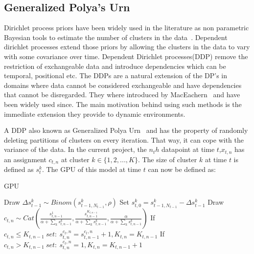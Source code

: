 \documentclass[twoside,hidelinks]{article}
\begin{document}
\subsection{Generalized Polya's Urn}
Dirichlet process priors have been widely used in the literature as non parametric Bayesian tools to estimate the number of clusters in the data~\cite{antoniak}. Dependent dirichlet processes extend those priors by allowing the clusters in the data to vary with some covariance over time. Dependent Dirichlet processes(DDP) remove the restriction of exchangeable data and introduce dependencies which can be temporal, positional etc. The DDPs are a natural extension of the DP's in domains where data cannot be considered exchangeable and have dependencies that cannot be disregarded. They where introduced by MacEachern~\cite{theory:ddp} and have been widely used since. The main motivation behind using such methods is the immediate extension they provide to dynamic environments. 

A DDP also known as Generalized Polya Urn~\cite{caron} and has the property of randomly deleting partitions of clusters on every iteration. That way, it can cope with the variance of the data. In the current project, the $n_th$ datapoint at time $t$,$x_{t,n}$ has an assignment $c_{t,n}$ at cluster $k \in \{1,2,..., K\} $. The size of cluster $k$ at time $t$ is defined as $s_t^k$. The GPU of this model at time $t$ can now be defined as:



\begin{algorithm}
  \caption{GPU}\label{GPU}
  \begin{algorithmic}[1]

	      \State Draw $\Delta s_{t-1}^k \sim Binom(s_{t-1,N_{t-1}}^k, \rho) $ 
	      \State Set $s_{t,0}^{k} = s_{t-1,N_{t-1}}^{k} -\Delta s_{t-1}^k$
      \EndFor
      	    \State Draw $c_{t,n} \sim Cat( \frac{ s_{t,n-1}^{1} }{\alpha + \sum_k s_{t,n-1}^{k} }, \frac{ s_{t,n-1}^{K_{t,n-1}} }{\alpha + \sum_k s_{t,n-1}^{k} } , \frac{ \alpha}{\alpha + \sum_k s_{t,n-1}^{k} }) $
      	    \State If $c_{t,n} \leq K_{t,n-1}\ set:\ s_{t,n}^{c_t,n} = s_{t,n-1}^{c_t,n} + 1 , K_{t,n} = K_{t,n-1}$
      	    \State If $c_{t,n} > K_{t,n-1}\ set:\ s_{t,n}^{c_t,n} = 1 , K_{t,n} = K_{t,n-1} + 1$
      \EndFor
    \EndProcedure
  \end{algorithmic}
\end{algorithm}
\end{document}
